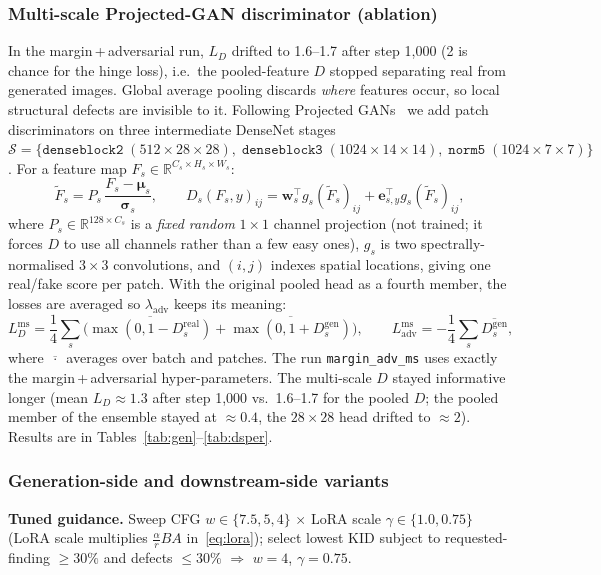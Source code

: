 \documentclass[twoside,english]{article}
\newcommand{\R}{\mathbb{R}}
\begin{document}
\subsubsection{Multi-scale Projected-GAN discriminator (ablation)}\label{sec:ms}
In the margin\,+\,adversarial run, $L_D$ drifted to 1.6--1.7 after step 1{,}000 (2 is chance for the hinge loss), i.e.\ the pooled-feature $D$ stopped separating real from generated images. Global average pooling discards \emph{where} features occur, so local structural defects are invisible to it. Following Projected GANs~\citep{sauer2021projected} we add patch discriminators on three intermediate DenseNet stages $\mathcal S=\{\texttt{denseblock2}\;(512\!\times\!28\!\times\!28),\;\texttt{denseblock3}\;(1024\!\times\!14\!\times\!14),\;\texttt{norm5}\;(1024\!\times\!7\!\times\!7)\}$. For a feature map $F_s\in\R^{C_s\times H_s\times W_s}$:
\begin{equation}
\tilde F_s=P_s\,\frac{F_s-\boldsymbol\mu_s}{\boldsymbol\sigma_s},\qquad
D_s(F_s,y)_{ij}=\mathbf w_s^\top g_s(\tilde F_s)_{ij}+\mathbf e_{s,y}^\top g_s(\tilde F_s)_{ij},
\end{equation}
where $P_s\in\R^{128\times C_s}$ is a \emph{fixed random} $1\times1$ channel projection (not trained; it forces $D$ to use all channels rather than a few easy ones), $g_s$ is two spectrally-normalised $3\times3$ convolutions, and $(i,j)$ indexes spatial locations, giving one real/fake score per patch. With the original pooled head as a fourth member, the losses are averaged so $\lambda_{\text{adv}}$ keeps its meaning:
\begin{equation}
L_D^{\text{ms}}=\frac{1}{4}\sum_{s}\Big(\overline{\max(0,1-D_s^{\text{real}})}+\overline{\max(0,1+D_s^{\text{gen}})}\Big),\qquad
L_{\text{adv}}^{\text{ms}}=-\frac{1}{4}\sum_s\overline{D_s^{\text{gen}}},
\end{equation}
where $\overline{\,\cdot\,}$ averages over batch and patches. The run \texttt{margin\_adv\_ms} uses exactly the margin\,+\,adversarial hyper-parameters. The multi-scale $D$ stayed informative longer (mean $L_D\approx1.3$ after step 1{,}000 vs.\ 1.6--1.7 for the pooled $D$; the pooled member of the ensemble stayed at $\approx0.4$, the $28\times28$ head drifted to $\approx2$). Results are in Tables~\ref{tab:gen}--\ref{tab:dsper}.

\subsubsection{Generation-side and downstream-side variants}\label{sec:variants}
\textbf{Tuned guidance.} Sweep CFG $w\in\{7.5,5,4\}$ $\times$ LoRA scale $\gamma\in\{1.0,0.75\}$ (LoRA scale multiplies $\tfrac{\alpha}{r}BA$ in~\eqref{eq:lora}); select lowest KID subject to requested-finding $\ge30\%$ and defects $\le30\%$ $\Rightarrow$ $w=4$, $\gamma=0.75$.
\end{document}
